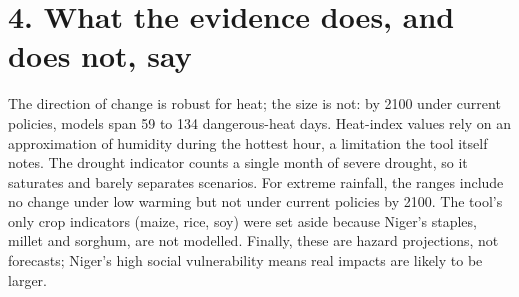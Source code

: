 \documentclass[10pt,a4paper]{article}
\begin{document}
\section{4. What the evidence does, and does not, say}
The direction of change is robust for heat; the size is not: by 2100 under current policies, models span 59
to 134 dangerous-heat days. Heat-index values rely on an approximation of humidity during the hottest hour, a
limitation the tool itself notes. The drought indicator counts a single month of severe drought, so it
saturates and barely separates scenarios. For extreme rainfall, the ranges include no change under low warming
but not under current policies by 2100. The tool's only crop indicators (maize, rice, soy) were set aside
because Niger's staples, millet and sorghum, are not modelled. Finally, these are hazard projections, not
forecasts; Niger's high social vulnerability means real impacts are likely to be larger.

\clearpage
\end{document}
